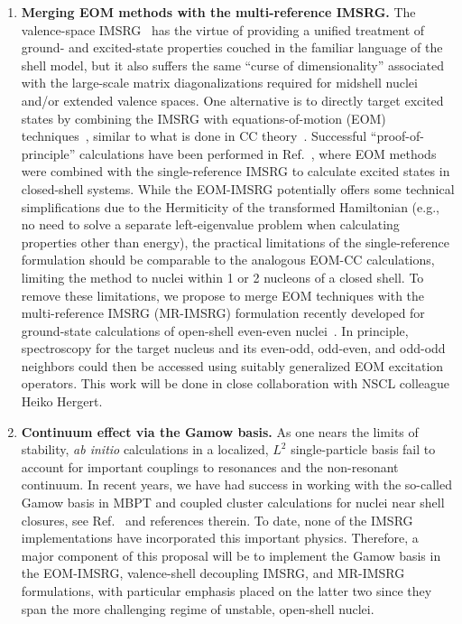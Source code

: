 \begin{enumerate}
\item {\bf Merging EOM methods with the multi-reference IMSRG.}  The
  valence-space IMSRG~\cite{Tsukiyama:2012fk,Bogner:2014tg,
    Stroberg:2015ymf,Stroberg:2016ung} has the virtue of providing a
  unified treatment of ground- and excited-state properties couched in the familiar language of the shell model, but it also suffers the same ``curse
  of dimensionality'' associated with the large-scale matrix
  diagonalizations required for midshell nuclei and/or
  extended valence spaces.  One alternative is to directly target excited states by combining the
  IMSRG with equations-of-motion (EOM) techniques~\cite{Rowe:1968eq},
  similar to what is done in CC
  theory~\cite{Ekstrom:2014iya,Jansen:2012ey}. Successful
  ``proof-of-principle'' calculations have been performed in
  Ref.~\cite{Parzuchowski:2016njm}, where EOM methods were combined
  with the single-reference IMSRG to calculate excited states in
  closed-shell systems. While the EOM-IMSRG potentially offers some
  technical simplifications due to the Hermiticity of the transformed
  Hamiltonian (e.g., no need to solve a separate left-eigenvalue
  problem when calculating properties other than energy), the
  practical limitations of the single-reference formulation should be
  comparable to the analogous EOM-CC calculations, limiting the method
  to nuclei within 1 or 2 nucleons of a closed shell. To remove these
  limitations, we propose to merge EOM techniques with the
  multi-reference IMSRG (MR-IMSRG) formulation recently developed for
  ground-state calculations of open-shell even-even
  nuclei~\cite{Hergert:2013ij,Hergert:2014vn}. In principle,
  spectroscopy for the target nucleus and its even-odd, odd-even, and
  odd-odd neighbors could then be accessed using suitably generalized
  EOM excitation operators. This work will be done in close collaboration with
  NSCL colleague Heiko Hergert.
  
\item {\bf Continuum effect via the Gamow basis.}  As one nears the
  limits of stability, \emph{ab initio} calculations in a localized,
  $L^2$ single-particle basis fail to account for important couplings
  to resonances and the non-resonant continuum. In recent years, we
  have had success in working with the so-called Gamow basis in MBPT
  and coupled cluster calculations for nuclei near shell closures, see
  Ref.~\cite{Hagen:2006pq,Tsukiyama:2009hy,Hagen:2012oq} and
  references therein. To date, none of the IMSRG implementations have
  incorporated this important physics. Therefore, a major component of
  this proposal will be to implement the Gamow basis in the EOM-IMSRG,
  valence-shell decoupling IMSRG, and MR-IMSRG formulations, with
  particular emphasis placed on the latter two since they span the
  more challenging regime of unstable, open-shell nuclei. 
  

\end{enumerate}
